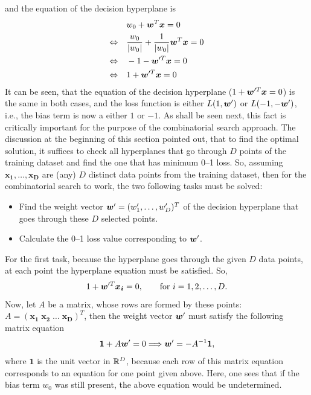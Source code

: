 and the equation of the decision hyperplane is 
\[ \begin{split} 
&w_0 + \boldsymbol{w}^T\boldsymbol{x} = 0 \\
\Leftrightarrow \quad
&\frac{w_0}{|w_0|} + \frac{1}{|w_0|} \boldsymbol{w}^T \boldsymbol{x}  = 0 \\ \Leftrightarrow \quad
&-1 - \boldsymbol{w}'^T \boldsymbol{x} = 0 \\
\Leftrightarrow \quad
&1 + \boldsymbol{w}'^T \boldsymbol{x} = 0
\end{split} \]
It can be seen, that the equation of the decision hyperplane ($1 +
\boldsymbol{w}'^T \boldsymbol{x} = 0$) is the same in both cases, and the loss
function is either $L(1, \boldsymbol{w}')$ or $L(-1, -\boldsymbol{w}')$, i.e., the bias term
is now a either $1$ or $-1$. As shall be
seen next, this fact is critically important for the purpose of the
combinatorial search approach. The discussion at the beginning of this
section pointed out, that to find the optimal solution, it suffices to
check all hyperplanes that go through $D$ points of the training
dataset and find the one that has minimum 0--1 loss. So, assuming
$\boldsymbol{x_1}, \dots, \boldsymbol{x_D}$ are (any) $D$ distinct
data points from the training dataset, then for the combinatorial
search to work, the two following tasks must be solved:
\begin{itemize}
\item Find the weight vector $\boldsymbol{w}'=(w'_1, \dots, w'_D)^T$ of the
  decision hyperplane that goes through these $D$ selected points.
\item Calculate the 0--1 loss value corresponding to $\boldsymbol{w}'$.
\end{itemize}

For the first task, because the hyperplane goes through the given $D$
data points, at each point the hyperplane equation must be
satisfied. So,
$$ 1+ \boldsymbol{w}'^T\boldsymbol{x_i} = 0, \quad\quad \text{for } i = 1, 2, \dots, D.$$
Now, let $A$ be a matrix, whose rows are formed by these points: 
$A =(\boldsymbol{x_1}\; \boldsymbol{x_2}\; \dots \; \boldsymbol{x_D})^T$,
then the weight vector $\boldsymbol{w}'$ must satisfy the following matrix equation 
\begin{equation}\label{eq:matrix}
\boldsymbol{1} + A \boldsymbol{w}' = 0 \Longrightarrow \boldsymbol{w}' = -A^{-1}\boldsymbol{1},
\end{equation}
where $\boldsymbol{1}$ is the unit vector in $\mathbb{R}^D$, because each row
of this matrix equation corresponds to an equation for one point given
above. Here, one sees that if the bias term $w_0$ was still present,
the above equation would be undetermined.

